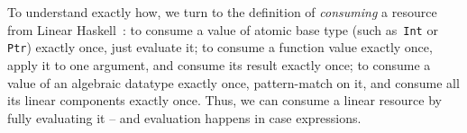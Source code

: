 \documentclass[acmsmall,review,screen]{acmart}
\newcommand{\lolli}{\multimap}
\newcommand{\tensor}{\otimes}
\begin{document}
%
%
%
%
To understand exactly how,
we turn to the definition of \emph{consuming} a resource from Linear
Haskell~\cite{cite:linearhaskell}:
to consume a value of atomic base type (such as~\texttt{Int} or
        \texttt{Ptr}) exactly once, just evaluate it;
        to consume a function value exactly once, apply it to one argument,
        and consume its result exactly once;
        to consume a value of an algebraic datatype exactly once,
        pattern-match on it, and consume all its linear components exactly once.
Thus, we can consume a linear resource by fully evaluating it -- and evaluation
happens in case expressions.

\end{document}
